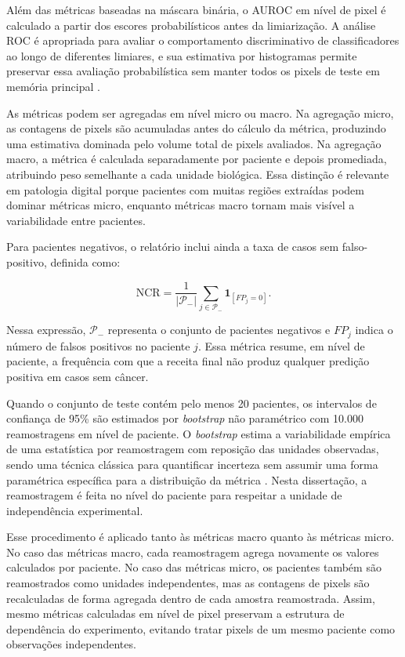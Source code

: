 Além
das métricas baseadas na máscara binária, o AUROC em nível de pixel é calculado
a partir dos escores probabilísticos antes da limiarização. A análise ROC é
apropriada para avaliar o comportamento discriminativo de classificadores ao
longo de diferentes limiares, e sua estimativa por histogramas permite preservar
essa avaliação probabilística sem manter todos os pixels de teste em memória
principal \cite{fawcett2006roc}.

As métricas podem ser agregadas em nível micro ou macro. Na agregação micro, as
contagens de pixels são acumuladas antes do cálculo da métrica, produzindo uma
estimativa dominada pelo volume total de pixels avaliados. Na agregação macro, a
métrica é calculada separadamente por paciente e depois promediada, atribuindo
peso semelhante a cada unidade biológica. Essa distinção é relevante em
patologia digital porque pacientes com muitas regiões extraídas podem dominar
métricas micro, enquanto métricas macro tornam mais visível a variabilidade
entre pacientes.

Para pacientes negativos, o relatório inclui ainda a taxa de casos sem
falso-positivo, definida como:

\begin{equation}
    \mathrm{NCR} =
    \frac{1}{|\mathcal{P}_-|}
    \sum_{j\in\mathcal{P}_-}
    \mathbf{1}_{[FP_j=0]} .
    \label{eq:ncr}
\end{equation}

Nessa expressão, $\mathcal{P}_-$ representa o conjunto de pacientes negativos e
$FP_j$ indica o número de falsos positivos no paciente $j$. Essa métrica resume,
em nível de paciente, a frequência com que a receita final não produz qualquer
predição positiva em casos sem câncer.

Quando o conjunto de teste contém pelo menos 20 pacientes, os intervalos de
confiança de 95\% são estimados por \textit{bootstrap} não paramétrico com
10.000 reamostragens em nível de paciente. O \textit{bootstrap} estima a
variabilidade empírica de uma estatística por reamostragem com reposição das
unidades observadas, sendo uma técnica clássica para quantificar incerteza sem
assumir uma forma paramétrica específica para a distribuição da métrica
\cite{efron1979bootstrap}. Nesta dissertação, a reamostragem é feita no nível do
paciente para respeitar a unidade de independência experimental.

Esse procedimento é aplicado tanto às métricas macro quanto às métricas micro.
No caso das métricas macro, cada reamostragem agrega novamente os valores
calculados por paciente. No caso das métricas micro, os pacientes também são
reamostrados como unidades independentes, mas as contagens de pixels são
recalculadas de forma agregada dentro de cada amostra reamostrada. Assim, mesmo
métricas calculadas em nível de pixel preservam a estrutura de dependência do
experimento, evitando tratar pixels de um mesmo paciente como observações
independentes.

